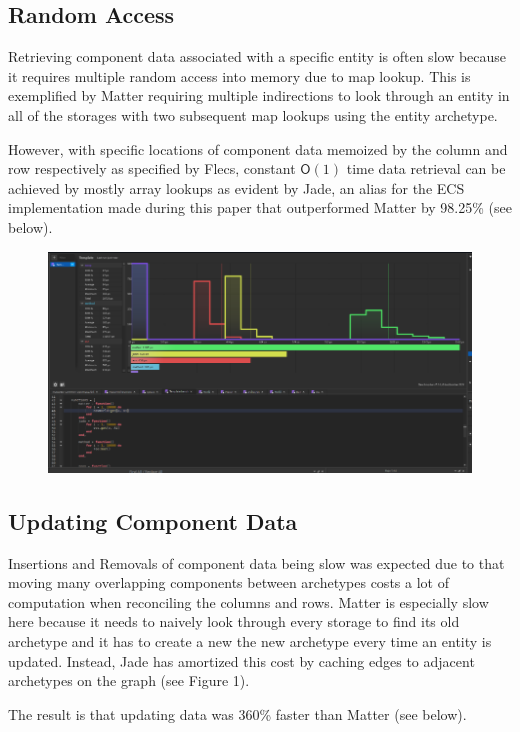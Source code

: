 \documentclass[openany, amssymb, psamsfonts]{amsart}
\theoremstyle{definition}
\numberwithin{equation}{section}
\begin{document}
\subsection{Random Access}
Retrieving component data associated with a specific entity is often slow because it requires 
multiple random access into memory due to map lookup. This is exemplified by Matter requiring multiple 
indirections to look through an entity in all of the storages with two subsequent map lookups 
using the entity archetype. 

However, with specific locations of component data memoized by the
column and row respectively as specified by Flecs, constant $\mathsf{O}(1)$ time data retrieval 
can be achieved by mostly array lookups as evident by Jade, an alias for the ECS implementation 
made during this paper that outperformed Matter by 98.25\% (see below).
\begin{figure}[htbp]
\centering
\includegraphics[scale=0.5]{../../images/random_access.png}\label{Fig 4: Random Access}
\end{figure}

\subsection{Updating Component Data}
Insertions and Removals of component data being slow was expected due to that moving many overlapping
components between archetypes costs a lot of computation when reconciling the columns and rows. 
Matter is especially slow here because it needs to naively look through every storage to find 
its old archetype and it has to create a new the new archetype every time an entity is updated. 
Instead, Jade has amortized this cost by caching edges to adjacent archetypes on the graph (see Figure 1).

The result is that updating data was 360\% faster than Matter (see below).
\end{document}

